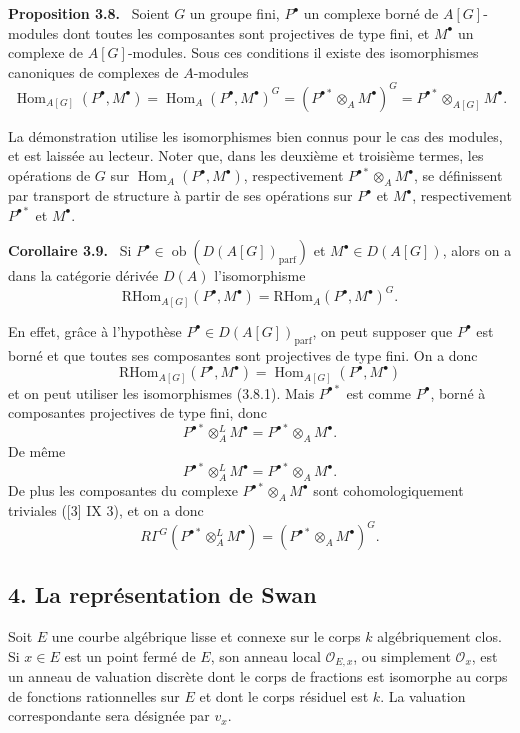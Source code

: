 \documentclass[11pt]{article}
\newenvironment{statement}[1]{\par\medskip\noindent\textbf{#1.}\ }{\par\medskip}
\DeclareMathOperator{\Hom}{Hom}
\providecommand{\RHom}{\mathrm{RHom}}
\providecommand{\parf}{\mathrm{parf}}
\providecommand{\Ob}{\operatorname{ob}}
\providecommand{\RHom}{\mathrm{RHom}}
\providecommand{\Hom}{\operatorname{Hom}}
\providecommand{\RHom}{\mathrm R\mathcal{H}om}
\providecommand{\Ob}{\operatorname{ob}}
\providecommand{\Ob}{\operatorname{Ob}}
\providecommand{\parf}{\mathrm{parf}}
\providecommand{\RHom}{\mathrm{RHom}}
\begin{document}
\begin{statement}{Proposition 3.8}
Soient $G$ un groupe fini, $P^\bullet$ un complexe borné de $A[G]$-modules dont toutes les composantes sont projectives de type fini, et $M^\bullet$ un complexe de $A[G]$-modules. Sous ces conditions il existe des isomorphismes canoniques de complexes de $A$-modules
\[
\Hom_{A[G]}(P^\bullet,M^\bullet)=\Hom_A(P^\bullet,M^\bullet)^G=(P^{\bullet *}\otimes_A M^\bullet)^G=P^{\bullet *}\otimes_{A[G]}M^\bullet.
\tag{3.8.1}
\]
\end{statement}

La démonstration utilise les isomorphismes bien connus pour le cas des modules, et est laissée au lecteur. Noter que, dans les deuxième et troisième termes, les opérations de $G$ sur $\Hom_A(P^\bullet,M^\bullet)$, respectivement $P^{\bullet *}\otimes_A M^\bullet$, se définissent par transport de structure à partir de ses opérations sur $P^\bullet$ et $M^\bullet$, respectivement $P^{\bullet *}$ et $M^\bullet$.

\begin{statement}{Corollaire 3.9}
Si $P^\bullet\in\Ob(D(A[G])_{\parf})$ et $M^\bullet\in D(A[G])$, alors on a dans la catégorie dérivée $D(A)$ l'isomorphisme
\[
\RHom_{A[G]}(P^\bullet,M^\bullet)=\RHom_A(P^\bullet,M^\bullet)^G.
\tag{3.9.1}
\]
\end{statement}

En effet, grâce à l'hypothèse $P^\bullet\in D(A[G])_{\parf}$, on peut supposer que $P^\bullet$ est borné et que toutes ses composantes sont projectives de type fini. On a donc
\[
\RHom_{A[G]}(P^\bullet,M^\bullet)=\Hom_{A[G]}(P^\bullet,M^\bullet)
\]
et on peut utiliser les isomorphismes (3.8.1). Mais $P^{\bullet *}$ est comme $P^\bullet$, borné à composantes projectives de type fini, donc
\[
P^{\bullet *}\otimes_A^L M^\bullet=P^{\bullet *}\otimes_A M^\bullet.
\]
De même
\[
P^{\bullet *}\otimes_A^L M^\bullet=P^{\bullet *}\otimes_A M^\bullet.
\]
De plus les composantes du complexe $P^{\bullet *}\otimes_A M^\bullet$ sont cohomologiquement triviales ([3] IX 3), et on a donc
\[
R\Gamma^G(P^{\bullet *}\otimes_A^L M^\bullet)=(P^{\bullet *}\otimes_A M^\bullet)^G.
\]

\subsection*{4. La représentation de Swan}

Soit $E$ une courbe algébrique lisse et connexe sur le corps $k$ algébriquement clos. Si $x\in E$ est un point fermé de $E$, son anneau local $\mathcal O_{E,x}$, ou simplement $\mathcal O_x$, est un anneau de valuation discrète dont le corps de fractions est isomorphe au corps de fonctions rationnelles sur $E$ et dont le corps résiduel est $k$. La valuation correspondante sera désignée par $v_x$.
\end{document}
